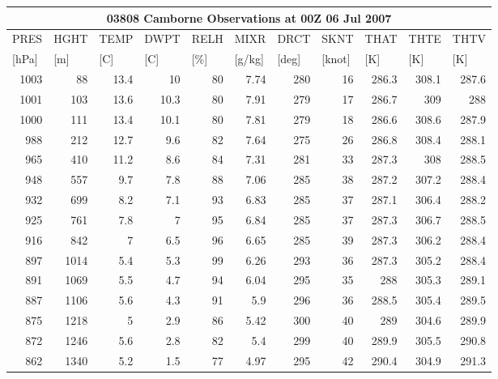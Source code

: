 \documentclass{article}
\begin{document}
\begin{longtable}{|r|r|r|r|r|r|r|r|r|r|r}
\multicolumn{11}{c}{\textbf{03808 Camborne Observations at 00Z 06 Jul 2007}} \\ \hline
\multicolumn{1}{l}{PRES } & \multicolumn{1}{l}{HGHT } & \multicolumn{1}{l}{TEMP } & \multicolumn{1}{l}{DWPT } & \multicolumn{1}{l}{RELH } & \multicolumn{1}{l}{MIXR } & \multicolumn{1}{l}{DRCT } & \multicolumn{1}{l}{SKNT } & \multicolumn{1}{l}{THAT } & \multicolumn{1}{l}{ THTE } & \multicolumn{1}{l}{THTV } \\
\multicolumn{1}{l}{[hPa]} & \multicolumn{1}{l}{[m]} & \multicolumn{1}{l}{[C]} & \multicolumn{1}{l}{[C] } & \multicolumn{1}{l}{[\%]} & \multicolumn{1}{l}{[g/kg]} & \multicolumn{1}{l}{[deg]} & \multicolumn{1}{l}{[knot]} & \multicolumn{1}{l}{[K]} & \multicolumn{1}{l}{[K]} & \multicolumn{1}{l}{[K]} \\ \hline
1003 & 88 & 13.4 & 10 & 80 & 7.74 & 280 & 16 & 286.3 & 308.1 & 287.6 \\
1001 & 103 & 13.6 & 10.3 & 80 & 7.91 & 279 & 17 & 286.7 & 309 & 288 \\
1000 & 111 & 13.4 & 10.1 & 80 & 7.81 & 279 & 18 & 286.6 & 308.6 & 287.9 \\
988 & 212 & 12.7 & 9.6 & 82 & 7.64 & 275 & 26 & 286.8 & 308.4 & 288.1 \\
965 & 410 & 11.2 & 8.6 & 84 & 7.31 & 281 & 33 & 287.3 & 308 & 288.5 \\
948 & 557 & 9.7 & 7.8 & 88 & 7.06 & 285 & 38 & 287.2 & 307.2 & 288.4 \\
932 & 699 & 8.2 & 7.1 & 93 & 6.83 & 285 & 37 & 287.1 & 306.4 & 288.2 \\
925 & 761 & 7.8 & 7 & 95 & 6.84 & 285 & 37 & 287.3 & 306.7 & 288.5 \\
916 & 842 & 7 & 6.5 & 96 & 6.65 & 285 & 39 & 287.3 & 306.2 & 288.4 \\
897 & 1014 & 5.4 & 5.3 & 99 & 6.26 & 293 & 36 & 287.3 & 305.2 & 288.4 \\
891 & 1069 & 5.5 & 4.7 & 94 & 6.04 & 295 & 35 & 288 & 305.3 & 289.1 \\
887 & 1106 & 5.6 & 4.3 & 91 & 5.9 & 296 & 36 & 288.5 & 305.4 & 289.5 \\
875 & 1218 & 5 & 2.9 & 86 & 5.42 & 300 & 40 & 289 & 304.6 & 289.9 \\
872 & 1246 & 5.6 & 2.8 & 82 & 5.4 & 299 & 40 & 289.9 & 305.5 & 290.8 \\
862 & 1340 & 5.2 & 1.5 & 77 & 4.97 & 295 & 42 & 290.4 & 304.9 & 291.3 \\

\end{longtable}
\end{document}

